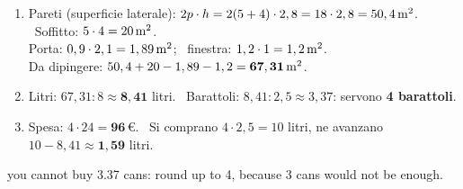 \begin{solbox}
\begin{enumerate}
\item Pareti (superficie laterale): $2p\cdot h=2(5+4)\cdot2,8=18\cdot2,8=50,4\,\mathrm{m^2}$. \ Soffitto: $5\cdot4=20\,\mathrm{m^2}$.\\
Porta: $0,9\cdot2,1=1,89\,\mathrm{m^2}$; \ finestra: $1,2\cdot1=1,2\,\mathrm{m^2}$.\\
Da dipingere: $50,4+20-1,89-1,2=\mathbf{67,31\,\mathrm{m^2}}$.
\item Litri: $67,31:8\approx\mathbf{8,41}$ litri. \ Barattoli: $8,41:2,5\approx3,37$: servono \textbf{4 barattoli}.
\item Spesa: $4\cdot24=\mathbf{96}$\,€. \ Si comprano $4\cdot2,5=10$ litri, ne avanzano $10-8,41\approx\mathbf{1,59}$ litri.
\end{enumerate}
{you cannot buy 3.37 cans: round up to 4, because 3 cans would not be enough.}
\end{solbox}

